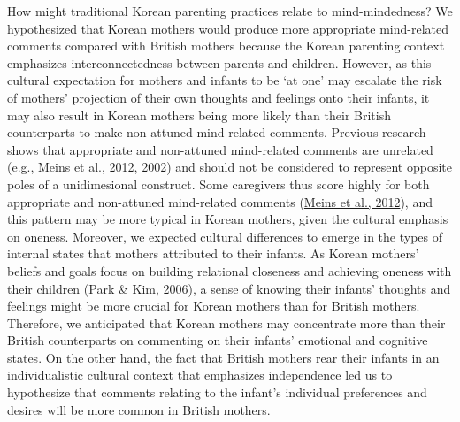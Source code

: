\documentclass[
]{article}
\begin{document}
How might traditional Korean parenting practices relate to mind-mindedness? We hypothesized that Korean mothers would produce more appropriate mind-related comments compared with British mothers because the Korean parenting context emphasizes interconnectedness between parents and children. However, as this cultural expectation for mothers and infants to be `at one' may escalate the risk of mothers' projection of their own thoughts and feelings onto their infants, it may also result in Korean mothers being more likely than their British counterparts to make non-attuned mind-related comments. Previous research shows that appropriate and non-attuned mind-related comments are unrelated (e.g., \protect\hyperlink{ref-Meins2012}{Meins et al., 2012}, \protect\hyperlink{ref-Meins2002}{2002}) and should not be considered to represent opposite poles of a unidimesional construct. Some caregivers thus score highly for both appropriate and non-attuned mind-related comments (\protect\hyperlink{ref-Meins2012}{Meins et al., 2012}), and this pattern may be more typical in Korean mothers, given the cultural emphasis on oneness. Moreover, we expected cultural differences to emerge in the types of internal states that mothers attributed to their infants. As Korean mothers' beliefs and goals focus on building relational closeness and achieving oneness with their children (\protect\hyperlink{ref-Park2006}{Park \& Kim, 2006}), a sense of knowing their infants' thoughts and feelings might be more crucial for Korean mothers than for British mothers. Therefore, we anticipated that Korean mothers may concentrate more than their British counterparts on commenting on their infants' emotional and cognitive states. On the other hand, the fact that British mothers rear their infants in an individualistic cultural context that emphasizes independence led us to hypothesize that comments relating to the infant's individual preferences and desires will be more common in British mothers.
\end{document}
